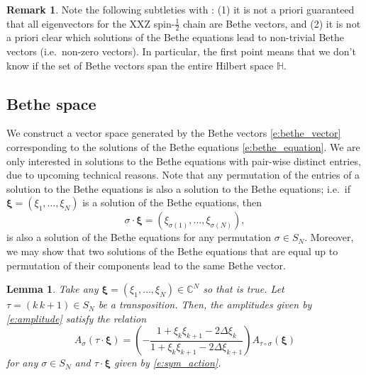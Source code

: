 \documentclass[a4paper,11pt]{article}
\newtheorem{lemma}[theorem]{Lemma}
\theoremstyle{definition}
\newtheorem{remark}[theorem]{Remark}
\begin{document}
\begin{remark}
Note the following subtleties with : (1) it is not a priori guaranteed that all eigenvectors for the XXZ spin-$\tfrac{1}{2}$ chain are Bethe vectors, and (2) it is not a priori clear which solutions of the Bethe equations lead to non-trivial Bethe vectors (i.e.~non-zero vectors). In particular, the first point means that we don't know if the set of Bethe vectors span the entire Hilbert space $\mathbb{H}$. 
\end{remark}


\subsection{Bethe space}

We construct a vector space generated by the Bethe vectors \eqref{e:bethe_vector} corresponding to the solutions of the Bethe equations \eqref{e:bethe_equation}. We are only interested in solutions to the Bethe equations with pair-wise distinct entries, due to upcoming technical reasons. Note that any permutation of the entries of a solution to the Bethe equations is also a solution to the Bethe equations; i.e.~if $\boldsymbol{\xi} = (\xi_1, \dots, \xi_N)$ is a solution of the Bethe equations, then 
\begin{equation}\label{e:sym_action}
    \sigma \cdot \boldsymbol{\xi} = (\xi_{\sigma(1)}, \dots, \xi_{\sigma(N)}),
\end{equation}
is also a solution of the Bethe equations for any permutation $\sigma \in S_N$. Moreover, we may show that two solutions of the Bethe equations that are equal up to permutation of their components lead to the same Bethe vector.

\begin{lemma}\label{l:amps_rel}
Take any $\boldsymbol{\xi} = (\xi_1, \dots, \xi_N) \in \mathbb{C}^N$ so that  is true. Let $\tau = (k \, k+1) \in S_N$ be a transposition. Then, the amplitudes given by \eqref{e:amplitude} satisfy the relation
\begin{equation}
    A_{\sigma} (\tau \cdot \boldsymbol{\xi}) =  \left(-\frac{1 + \xi_k \xi_{k+1} - 2 \Delta \xi_k}{1 + \xi_k \xi_{k+1} - 2 \Delta \xi_{k+1}}\right) A_{\tau \circ \sigma}(\boldsymbol{\xi}) 
\end{equation}
for any $\sigma \in S_N$ and $\tau \cdot \boldsymbol{\xi}$ given by \eqref{e:sym_action}.
\end{lemma}
\end{document}
